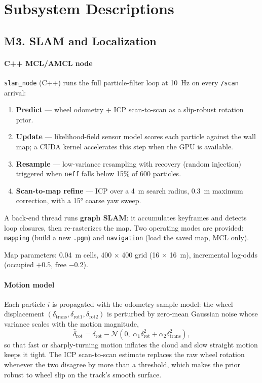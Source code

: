 \documentclass[conference]{IEEEtran}
\begin{document}
\section{Subsystem Descriptions}
\label{sec:subsys}

\subsection{M3. SLAM and Localization}

\paragraph{C++ MCL/AMCL node}
\texttt{slam\_node} (C++) runs the full particle-filter loop at 10~Hz
on every \texttt{/scan} arrival:

\begin{enumerate}[noitemsep, leftmargin=*]
  \item \textbf{Predict} --- wheel odometry + ICP scan-to-scan as a
        slip-robust rotation prior.
  \item \textbf{Update} --- likelihood-field sensor model scores each
        particle against the wall map; a CUDA kernel accelerates this
        step when the GPU is available.
  \item \textbf{Resample} --- low-variance resampling with recovery
        (random injection) triggered when \texttt{neff} falls below
        15\% of 600 particles.
  \item \textbf{Scan-to-map refine} --- ICP over a 4~m search radius,
        0.3~m maximum correction, with a 15° coarse yaw sweep.
\end{enumerate}

A back-end thread runs \textbf{graph SLAM}: it accumulates keyframes
and detects loop closures, then re-rasterizes the map. Two operating
modes are provided: \texttt{mapping} (build a new \texttt{.pgm}) and
\texttt{navigation} (load the saved map, MCL only).

Map parameters: 0.04~m cells, 400 × 400 grid (16 × 16~m), incremental
log-odds (occupied $+0.5$, free $-0.2$).

\paragraph{Motion model}
Each particle $i$ is propagated with the odometry sample model: the
wheel displacement $(\delta_{\text{trans}}, \delta_{\text{rot1}},
\delta_{\text{rot2}})$ is perturbed by zero-mean Gaussian noise whose
variance scales with the motion magnitude,
\[
\hat\delta_{\text{rot}} = \delta_{\text{rot}}
  - \mathcal{N}\!\left(0,\; \alpha_1 \delta_{\text{rot}}^2
                            + \alpha_2 \delta_{\text{trans}}^2\right),
\]
so that fast or sharply-turning motion inflates the cloud and slow
straight motion keeps it tight. The ICP scan-to-scan estimate replaces
the raw wheel rotation whenever the two disagree by more than a
threshold, which makes the prior robust to wheel slip on the track's
smooth surface.
\end{document}
